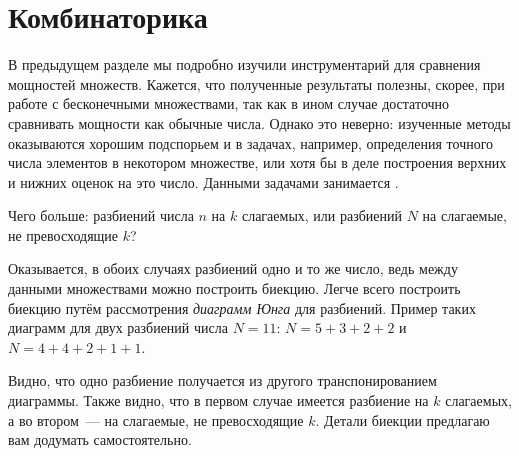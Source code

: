 \section{Комбинаторика}
\label{sec:combinatorics}

В предыдущем разделе мы подробно изучили инструментарий для сравнения мощностей множеств.
Кажется, что полученные результаты полезны, скорее, при работе с бесконечными множествами,
так как в ином случае достаточно сравнивать мощности как обычные числа.
Однако это неверно: изученные методы
оказываются хорошим подспорьем и в задачах,
например, определения точного числа элементов в некотором множестве, или хотя бы в деле построения верхних и нижних оценок на это число.
Данными задачами занимается .

\begin{example}
    Чего больше: разбиений числа $ n $ на $ k $ слагаемых, или разбиений $ N $ на слагаемые, не превосходящие $ k $?



    Оказывается, в обоих случаях разбиений одно и то же число, ведь между данными множествами можно построить биекцию.
    Легче всего построить биекцию путём рассмотрения \textit{диаграмм Юнга} для разбиений.
    Пример таких диаграмм для двух разбиений числа $ N = 11 $: $ N = 5 + 3 + 2 + 2 $ и $ N = 4 + 4 + 2 + 1 + 1 $.
    \begin{center}
        \hspace{2\baselineskip}
    \end{center}
    Видно, что одно разбиение получается из другого транспонированием диаграммы.
    Также видно, что в первом случае имеется разбиение на $ k $ слагаемых, а во втором~--- на слагаемые, не превосходящие $ k $.
    Детали биекции предлагаю вам додумать самостоятельно.
\end{example}

